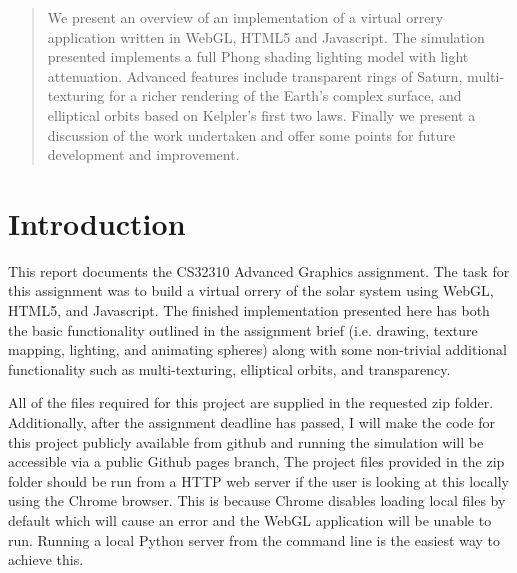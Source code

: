 \documentclass[conference]{IEEEtran}
\begin{document}




%
\IEEEpeerreviewmaketitle

\begin{abstract}
We present an overview of an implementation of a virtual orrery application written in WebGL, HTML5 and Javascript. The simulation presented implements a full Phong shading lighting model with light attenuation. Advanced features include transparent rings of Saturn, multi-texturing for a richer rendering of the Earth's complex surface, and elliptical orbits based on Kelpler's first two laws. Finally we present a discussion of the work undertaken and offer some points for future development and improvement.
\end{abstract}

\section{Introduction}
This report documents the CS32310 Advanced Graphics assignment. The task for this assignment was to build a virtual orrery of the solar system using WebGL, HTML5, and Javascript. The finished implementation presented here has both the basic functionality outlined in the assignment brief (i.e. drawing, texture mapping, lighting, and animating spheres) along with some non-trivial additional functionality such as multi-texturing, elliptical orbits, and transparency. 

All of the files required for this project are supplied in the requested zip folder. Additionally, after the assignment deadline has passed, I will make the code for this project publicly available from github \cite{github} and running the simulation will be accessible via a public Github pages branch, The project files provided in the zip folder should be run from a HTTP web server if the user is looking at this locally using the Chrome browser. This is because Chrome disables loading local files by default which will cause an error and the WebGL application will be unable to run. Running a local Python server from the command line is the easiest way to achieve this.
\end{document}
